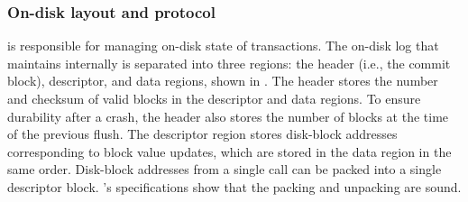 %

\subsubsection{On-disk layout and protocol}
\label{sec:log:layout}

\disklog is responsible for managing on-disk state of transactions. The
on-disk log that \disklog maintains internally is separated into three
regions: the header (i.e., the commit block), descriptor, and data regions,
shown in . The header stores the number and checksum of
valid blocks in the descriptor and data regions. To ensure durability after
a crash, the header also stores the number of blocks at the time of the
previous flush. The descriptor region stores disk-block addresses
corresponding to block value updates, which are stored in the data region
in the same order.  Disk-block addresses from a single  call can
be packed into a single descriptor block.  \disklog's specifications show
that the packing and unpacking are sound.

